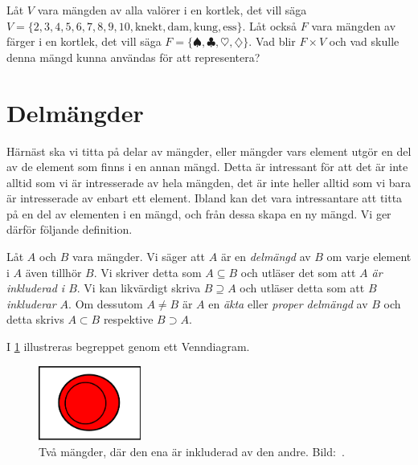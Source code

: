 \begin{exercise}\label{xrc:Kortlek}
  Låt \(V\) vara mängden av alla valörer i en kortlek, det vill säga
  \(V=\{2,3,4,5,6,7,8,9,10,\text{knekt},\text{dam},\text{kung},\text{ess}\}\).
  Låt också \(F\) vara mängden av färger i en kortlek, det vill säga
  \(F=\{\spadesuit,\clubsuit,\heartsuit,\diamondsuit\}\).
  Vad blir \(F\times V\) och vad skulle denna mängd kunna användas för att
  representera?
\end{exercise}


\section{Delmängder}%
\label{sec:Delmangder}
Härnäst ska vi titta på delar av mängder, eller mängder vars
element utgör en del av de element som finns i en annan mängd.
Detta är intressant för att det är inte alltid som vi är intresserade av hela
mängden, det är inte heller alltid som vi bara är intresserade av enbart ett
element.
Ibland kan det vara intressantare att titta på en del av elementen i en mängd,
och från dessa skapa en ny mängd.
Vi ger därför följande definition.

\begin{definition}\label{def:Delmangd}
  Låt \(A\) och \(B\) vara mängder.
  Vi säger att \(A\) är en \emph{delmängd} av \(B\) om varje element i \(A\)
  även tillhör \(B\).
  Vi skriver detta som \(A\subseteq B\) och utläser det som att \emph{\(A\)
  är inkluderad i \(B\)}.
  Vi kan likvärdigt skriva \(B\supseteq A\) och utläser detta som att
  \emph{\(B\) inkluderar \(A\)}.
  Om dessutom \(A\neq B\) är \(A\) en \emph{äkta} eller \emph{proper
  delmängd} av \(B\) och detta skrivs \(A\subset B\) respektive
  \(B\supset A\).
\end{definition}
I \cref{fig:Delmangd} illustreras begreppet genom ett Venndiagram.
\begin{figure}
  \includegraphics[width=0.3\textwidth]{figs/subset.pdf}
  \caption{%
    Två mängder, där den ena är inkluderad av den andre.
    Bild:~\cite{Wikipedia2013Set}.
  }\label{fig:Delmangd}
\end{figure}

